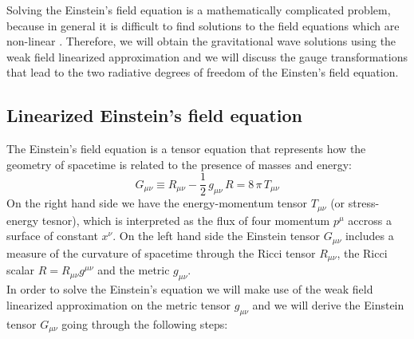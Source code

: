 Solving the Einstein's field equation is a mathematically complicated problem, because in general it is difficult to find solutions to the field equations which are non-linear    \cite{weinsteinEinsteinDiscoveryGravitational2016}.
Therefore, we will obtain the gravitational wave solutions using the weak field linearized approximation and we will discuss the  gauge transformations that lead to the two radiative degrees of freedom of the Einsten's field equation.\\

\subsection{Linearized Einstein's field equation}
The Einstein's field equation is a tensor equation that represents how the geometry of spacetime is related to the presence of masses and energy:
\begin{equation}
\label{einstein_eq}
G_{\mu \nu} \equiv R_{\mu \nu} - \dfrac{1}{2} \,  g_{\mu \nu} \, R =8 \, \pi \, T_{\mu \nu}
\end{equation}
On the right hand side we have the energy-momentum tensor $T_{\mu \nu}$ (or stress-energy tesnor), which is interpreted as the flux of four momentum $p^\mu$ accross a surface of constant $x^\nu$. 
On the left hand side the Einstein tensor $G_{\mu \nu}$ includes a measure of the curvature of spacetime through the Ricci tensor $R_{\mu \nu}$, the Ricci scalar $R = R_{\mu \nu} g^{\mu \nu} $ and the metric $g_{\mu \nu}$. \\
In order to solve the Einstein's equation we will make use of the weak field linearized approximation on the metric tensor $g_{\mu \nu}$ and we will derive the Einstein tensor $G_{\mu \nu}$ going through the following steps:
